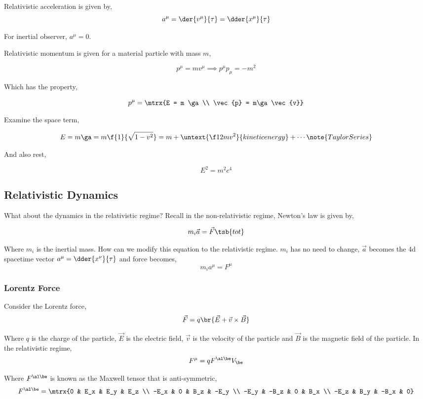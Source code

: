 \documentclass{article}
\begin{document}
Relativistic acceleration is given by,
\[ a^\mu = \der{v^\mu}{\tau} = \dder{x^\mu}{\tau} \]

For inertial observer, $a^\mu = 0$.

Relativistic momentum is given for a material particle with mass $m$,

\[ p^\mu = m v^\mu \implies p^\mu p_\mu = - m^2\]

Which has the property,

\[ p^\mu = \mtrx{E = m \ga \\ \vec{p} = m\ga \vec{v}} \]

Examine the space term,

\[ E = m \ga = m \f{1}{\sqrt{1-v^2}} = m + \untext{\f12 m v^2}{kinetic energy} + \cdots \note{Taylor Series} \]

And also rest,

\[ E^2 = m^2 c^4 \]

\subsection{Relativistic Dynamics}

What about the dynamics in the relativistic regime? Recall in the non-relativistic regime, Newton's law is given by,

\[ m_i \vec{a} = \vec{F}\tsb{tot} \]

Where $m_i$ is the inertial mass. How can we modify this equation to the relativistic regime. $m_i$ has no need to change, $\vec{a}$ becomes the 4d spacetime vector $a^\mu = \dder{x^\nu}{\tau}$ and force becomes,
\[ m_i a^\mu = F^\mu \]

\subsubsection{Lorentz Force}

Consider the Lorentz force,
\[ \vec{F} = q \br{\vec{E} + \vec{v} \times \vec{B}} \]

Where $q$ is the charge of the particle, $\vec{E}$ is the electric field, $\vec{v}$ is the velocity of the particle and $\vec{B}$ is the magnetic field of the particle. In the relativistic regime,
\[ F^\mu = q {F^{\al\be}} V_\be \]

Where $F^{\al\be}$ is known as the Maxwell tensor that is anti-symmetric,
\[ F^{\al\be} = \mtrx{0 & E_x & E_y & E_z \\ -E_x & 0 & B_z & -E_y \\ -E_y & -B_z & 0 & B_x \\ -E_z & B_y & -B_x & 0} \]
\end{document}
